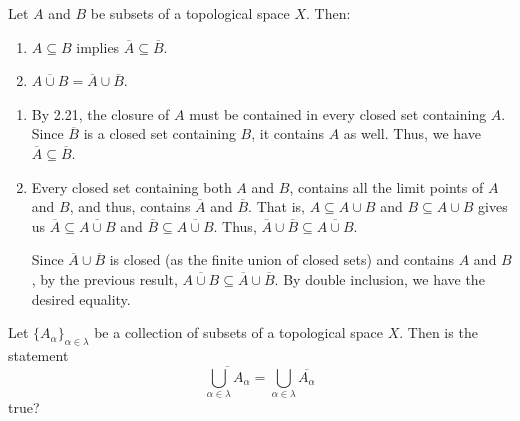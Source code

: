 \documentclass[12 pt, letterpaper]{hmcpset}
\begin{document}
\pagebreak

\begin{problem}[2.22]
	Let $A$ and $B$ be subsets of a topological space $X$. Then:
	\begin{enumerate}
		\item $A \subseteq B$ implies $\overline{A} \subseteq \overline{B}$.
		\item $\overline{A \cup B} = \overline{A} \cup \overline{B}$.
	\end{enumerate}
\end{problem}

\begin{solution}
	\begin{enumerate}
		\item By 2.21, the closure of $A$ must be contained in every closed set containing $A$. Since $\overline{B}$ is a closed set containing $B$, it contains $A$ as well. Thus, we have $\overline{A} \subseteq \overline{B}$.

		\item Every closed set containing both $A$ and $B$, contains all the limit points of $A$ and $B$, and thus, contains $\overline{A}$ and $\overline{B}$. That is, $A \subseteq A \cup B$ and $B \subseteq A \cup B$ gives us $\overline{A} \subseteq  \overline{A \cup B}$ and $\overline{B} \subseteq \overline{A \cup B}$. Thus, $\overline{A} \cup \overline{B} \subseteq \overline{A \cup B}$.

			Since $\overline{A} \cup \overline{B}$ is closed (as the finite union of closed sets) and contains $A$ and $B$, by the previous result, $\overline{A \cup B} \subseteq \overline{A} \cup \overline{B}$. By double inclusion, we have the desired equality.

	\end{enumerate}
\end{solution}

\pagebreak

\begin{problem}[2.23]
	Let $\{ A_{\alpha} \}_{\alpha \in \lambda}$ be a collection of subsets of a topological space $X$. Then is the statement
	\[
		\overline{\bigcup_{\alpha \in \lambda} A_{\alpha}} = \bigcup_{\alpha \in \lambda} \overline{A_{\alpha}}
	\]
	true?
\end{problem}
\end{document}

